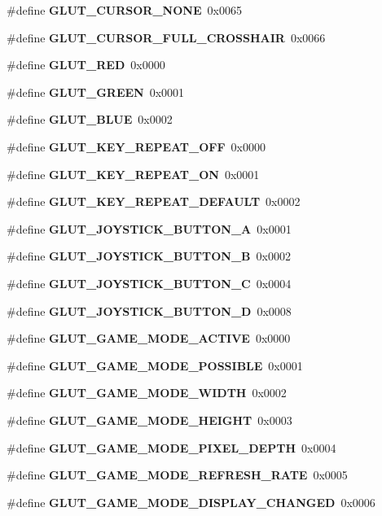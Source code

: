 \begin{DoxyCompactItemize}
\item 
\#define {\bf G\+L\+U\+T\+\_\+\+C\+U\+R\+S\+O\+R\+\_\+\+N\+O\+N\+E}~0x0065
\item 
\#define {\bf G\+L\+U\+T\+\_\+\+C\+U\+R\+S\+O\+R\+\_\+\+F\+U\+L\+L\+\_\+\+C\+R\+O\+S\+S\+H\+A\+I\+R}~0x0066
\item 
\#define {\bf G\+L\+U\+T\+\_\+\+R\+E\+D}~0x0000
\item 
\#define {\bf G\+L\+U\+T\+\_\+\+G\+R\+E\+E\+N}~0x0001
\item 
\#define {\bf G\+L\+U\+T\+\_\+\+B\+L\+U\+E}~0x0002
\item 
\#define {\bf G\+L\+U\+T\+\_\+\+K\+E\+Y\+\_\+\+R\+E\+P\+E\+A\+T\+\_\+\+O\+F\+F}~0x0000
\item 
\#define {\bf G\+L\+U\+T\+\_\+\+K\+E\+Y\+\_\+\+R\+E\+P\+E\+A\+T\+\_\+\+O\+N}~0x0001
\item 
\#define {\bf G\+L\+U\+T\+\_\+\+K\+E\+Y\+\_\+\+R\+E\+P\+E\+A\+T\+\_\+\+D\+E\+F\+A\+U\+L\+T}~0x0002
\item 
\#define {\bf G\+L\+U\+T\+\_\+\+J\+O\+Y\+S\+T\+I\+C\+K\+\_\+\+B\+U\+T\+T\+O\+N\+\_\+\+A}~0x0001
\item 
\#define {\bf G\+L\+U\+T\+\_\+\+J\+O\+Y\+S\+T\+I\+C\+K\+\_\+\+B\+U\+T\+T\+O\+N\+\_\+\+B}~0x0002
\item 
\#define {\bf G\+L\+U\+T\+\_\+\+J\+O\+Y\+S\+T\+I\+C\+K\+\_\+\+B\+U\+T\+T\+O\+N\+\_\+\+C}~0x0004
\item 
\#define {\bf G\+L\+U\+T\+\_\+\+J\+O\+Y\+S\+T\+I\+C\+K\+\_\+\+B\+U\+T\+T\+O\+N\+\_\+\+D}~0x0008
\item 
\#define {\bf G\+L\+U\+T\+\_\+\+G\+A\+M\+E\+\_\+\+M\+O\+D\+E\+\_\+\+A\+C\+T\+I\+V\+E}~0x0000
\item 
\#define {\bf G\+L\+U\+T\+\_\+\+G\+A\+M\+E\+\_\+\+M\+O\+D\+E\+\_\+\+P\+O\+S\+S\+I\+B\+L\+E}~0x0001
\item 
\#define {\bf G\+L\+U\+T\+\_\+\+G\+A\+M\+E\+\_\+\+M\+O\+D\+E\+\_\+\+W\+I\+D\+T\+H}~0x0002
\item 
\#define {\bf G\+L\+U\+T\+\_\+\+G\+A\+M\+E\+\_\+\+M\+O\+D\+E\+\_\+\+H\+E\+I\+G\+H\+T}~0x0003
\item 
\#define {\bf G\+L\+U\+T\+\_\+\+G\+A\+M\+E\+\_\+\+M\+O\+D\+E\+\_\+\+P\+I\+X\+E\+L\+\_\+\+D\+E\+P\+T\+H}~0x0004
\item 
\#define {\bf G\+L\+U\+T\+\_\+\+G\+A\+M\+E\+\_\+\+M\+O\+D\+E\+\_\+\+R\+E\+F\+R\+E\+S\+H\+\_\+\+R\+A\+T\+E}~0x0005
\item 
\#define {\bf G\+L\+U\+T\+\_\+\+G\+A\+M\+E\+\_\+\+M\+O\+D\+E\+\_\+\+D\+I\+S\+P\+L\+A\+Y\+\_\+\+C\+H\+A\+N\+G\+E\+D}~0x0006
\end{DoxyCompactItemize}
